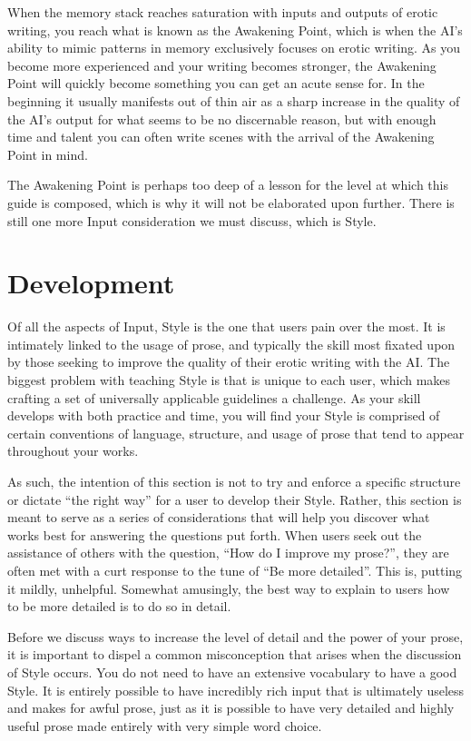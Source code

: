 \documentclass[Source-main.tex]{subfiles}
\begin{document}
When the memory stack reaches saturation with inputs and outputs of erotic writing, you reach what is known as the Awakening Point, which is when the AI’s ability to mimic patterns in memory exclusively focuses on erotic writing.
As you become more experienced and your writing becomes stronger, the Awakening Point will quickly become something you can get an acute sense for.
In the beginning it usually manifests out of thin air as a sharp increase in the quality of the AI’s output for what seems to be no discernable reason, but with enough time and talent you can often write scenes with the arrival of the Awakening Point in mind.

The Awakening Point is perhaps too deep of a lesson for the level at which this guide is composed, which is why it will not be elaborated upon further.
There is still one more Input consideration we must discuss, which is Style.


\section{Development}

Of all the aspects of Input, Style is the one that users pain over the most.
It is intimately linked to the usage of prose, and typically the skill most fixated upon by those seeking to improve the quality of their erotic writing with the AI.
The biggest problem with teaching Style is that is unique to each user, which makes crafting a set of universally applicable guidelines a challenge.
As your skill develops with both practice and time, you will find your Style is comprised of certain conventions of language, structure, and usage of prose that tend to appear throughout your works.

As such, the intention of this section is not to try and enforce a specific structure or dictate “the right way” for a user to develop their Style.
Rather, this section is meant to serve as a series of considerations that will help you discover what works best for answering the questions put forth.
When users seek out the assistance of others with the question, “How do I improve my prose?”, they are often met with a curt response to the tune of “Be more detailed”.
This is, putting it mildly, unhelpful.
Somewhat amusingly, the best way to explain to users how to be more detailed is to do so in detail.

Before we discuss ways to increase the level of detail and the power of your prose, it is important to dispel a common misconception that arises when the discussion of Style occurs.
You do not need to have an extensive vocabulary to have a good Style.
It is entirely possible to have incredibly rich input that is ultimately useless and makes for awful prose, just as it is possible to have very detailed and highly useful prose made entirely with very simple word choice.
\end{document}
